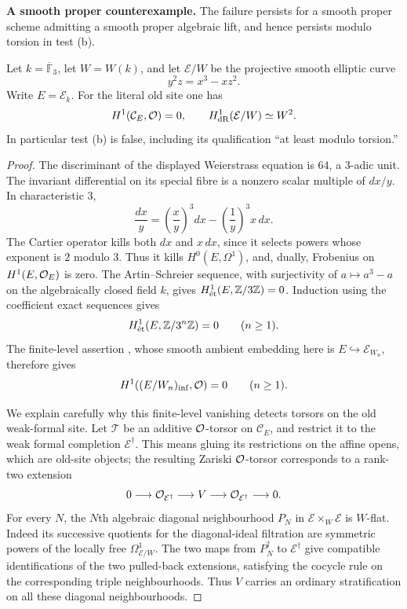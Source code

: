 \par\smallskip\noindent\textbf{A smooth proper counterexample.}
The failure persists for a smooth proper scheme admitting a smooth proper algebraic lift, and hence persists modulo torsion in test (b).

\begin{proposition}\label{prop:DE-old-proper}
Let $k=\overline{\mathbb F}_3$, let $W=W(k)$, and let $\mathcal E/W$ be the projective smooth elliptic curve
\[
                         y^2z=x^3-xz^2.
\]
Write $E=\mathcal E_k$.  For the literal old site one has
\[
 H^1(\mathcal C_E,\OO)=0,
 \qquad H^1_{\dR}(\mathcal E/W)\simeq W^2.
\]
In particular test (b) is false, including its qualification ``at least modulo torsion.''
\end{proposition}
\begin{proof}
The discriminant of the displayed Weierstrass equation is $64$, a $3$-adic unit.  The invariant differential on its special fibre is a nonzero scalar multiple of $dx/y$.  In characteristic $3$,
\[
 \frac{dx}{y}=\left(\frac{x}{y}\right)^3dx
                  -\left(\frac1y\right)^3x\,dx.
\]
The Cartier operator kills both $dx$ and $x\,dx$, since it selects powers whose exponent is $2$ modulo $3$.  Thus it kills $H^0(E,\Omega^1)$, and, dually, Frobenius on $H^1(E,\OO_E)$ is zero.  The Artin--Schreier sequence, with surjectivity of $a\mapsto a^3-a$ on the algebraically closed field $k$, gives
$H^1_{\et}(E,\mathbb Z/3\mathbb Z)=0$.  Induction using the coefficient exact sequences gives
\[
 H^1_{\et}(E,\mathbb Z/3^n\mathbb Z)=0\qquad(n\geq1).
\]
The finite-level assertion \cite[Corollary~4.7]{Ogus1975}, whose smooth ambient embedding here is $E\hookrightarrow\mathcal E_{W_n}$, therefore gives
\begin{equation}\label{eq:DE-old-proper-infzero}
                  H^1((E/W_n)_{\rm inf},\OO)=0
                  \qquad(n\geq1).
\end{equation}

We explain carefully why this finite-level vanishing detects torsors on the old weak-formal site.  Let $\mathcal T$ be an additive $\OO$-torsor on $\mathcal C_E$, and restrict it to the weak formal completion $\mathcal E^\dagger$.  This means gluing its restrictions on the affine opens, which are old-site objects; the resulting Zariski $\OO$-torsor corresponds to a rank-two extension
\[
     0\longrightarrow\OO_{\mathcal E^\dagger}
       \longrightarrow V\longrightarrow\OO_{\mathcal E^\dagger}
       \longrightarrow0.
\]
For every $N$, the $N$th algebraic diagonal neighbourhood $P_N$ in $\mathcal E\times_W\mathcal E$ is $W$-flat.  Indeed its successive quotients for the diagonal-ideal filtration are symmetric powers of the locally free $\Omega^1_{\mathcal E/W}$.  The two maps from $P_N^\dagger$ to $\mathcal E^\dagger$ give compatible identifications of the two pulled-back extensions, satisfying the cocycle rule on the corresponding triple neighbourhoods.  Thus $V$ carries an ordinary stratification on all these diagonal neighbourhoods.


\end{proof}
